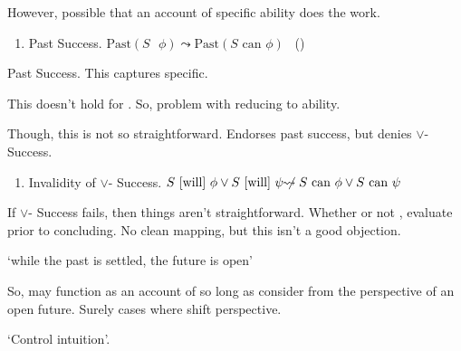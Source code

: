 \begin{note}
  However, possible that an account of specific ability does the work.

  \begin{enumerate}
  \item
    Past Success. \(\text{Past}(S\text{ }\phi) \leadsto \text{Past}(S\text{ can }\phi)\)%
    \mbox{ }\hfill\mbox{(\citeyear[2?]{Boylan:2020aa})}
  \end{enumerate}
  Past Success.
  This captures specific.

  This doesn't hold for .
  So, problem with reducing to ability.

  Though, this is not so straightforward.
  Endorses past success, but denies \(\lor\)- Success.

  \begin{enumerate}
  \item
    Invalidity of \(\lor\)- Success. \(S\text{ [will] }\phi \lor S\text{ [will] }\psi \not\!\!\leadsto S\text{ can }\phi \lor S\text{ can }\psi\)
  \end{enumerate}
  If \(\lor\)- Success fails, then things aren't straightforward.
  Whether or not \fc{}, evaluate prior to concluding.
  No clean mapping, but this isn't a good objection.

  `while the past is settled, the future is open'

  So, may function as an account of \fc{} so long as consider from the perspective of an open future.
  Surely cases where shift perspective.

  `Control intuition'.
\end{note}

